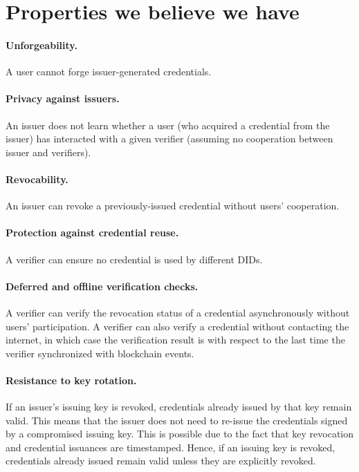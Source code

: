\documentclass[10pt,a4paper]{article}
\begin{document}

\section{Properties we believe we have}

\paragraph{Unforgeability.} A user cannot forge issuer-generated credentials.
\paragraph{Privacy against issuers.} An issuer does not learn whether a user (who acquired a credential from the issuer) has interacted with a given verifier (assuming no cooperation between issuer and verifiers).
\paragraph{Revocability.} An issuer can revoke a previously-issued credential without users’ cooperation.
\paragraph{Protection against credential reuse.} A verifier can ensure no credential is used by different DIDs. 
\paragraph{Deferred and offline verification checks.} A verifier can verify the revocation status of a credential asynchronously without users’ participation. A verifier can also verify a credential without contacting the internet, in which case the verification result is with respect to the last time the verifier synchronized with blockchain events.
\paragraph{Resistance to key rotation.} If an issuer's issuing key is revoked, credentials already issued by that key remain valid. This means that the issuer does not need to re-issue the credentials signed by a compromised issuing key. This is possible due to the fact that key revocation and credential issuances are timestamped. Hence, if an issuing key is revoked, credentials already issued remain valid unless they are explicitly revoked.
\end{document}
